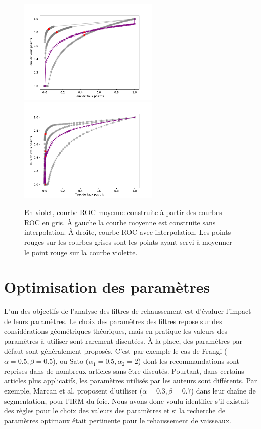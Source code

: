 \begin{figure}[!ht]
  \centering
  \includegraphics[height=5cm]{Images/ROC_badMean.pdf}
  \includegraphics[height=5cm]{Images/ROC_goodMean.pdf}
  \caption{En violet, courbe ROC moyenne construite à partir des courbes ROC en gris. À gauche la courbe moyenne est construite sans interpolation. À droite, courbe ROC avec interpolation. Les points rouges sur les courbes grises sont les points ayant servi à moyenner le point rouge sur la courbe violette.}
  \label{fig:good_and_bad_roc}
\end{figure}

\section{Optimisation des paramètres}

L'un des objectifs de l'analyse des filtres de rehaussement est d'évaluer l'impact de leurs paramètres. Le choix des paramètres des filtres repose sur des considérations géométriques théoriques, mais en pratique les valeurs des paramètres à utiliser sont rarement discutées. À la place, des paramètres par défaut sont généralement proposés. C'est par exemple le cas de Frangi ($\alpha=0.5,\beta=0.5$), ou Sato $(\alpha_1=0.5,\alpha_2=2$) dont les recommandations sont reprises dans de nombreux articles sans être discutés. Pourtant, dans certains articles plus applicatifs, les paramètres utilisés par les auteurs sont différents. Par exemple, Marcan et al. \cite{Marcan2014_vessel_seg} proposent d'utiliser ($\alpha=0.3,\beta=0.7$) dans leur chaîne de segmentation,  pour l'IRM du foie. Nous avons donc voulu identifier s'il existait des règles pour le choix des valeurs des paramètres et si la recherche de paramètres optimaux était pertinente pour le rehaussement de vaisseaux.

